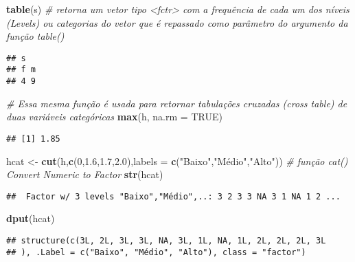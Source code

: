 \documentclass[]{article}
\newenvironment{Shaded}{\begin{snugshade}}{\end{snugshade}}
\newcommand{\KeywordTok}[1]{\textcolor[rgb]{0.13,0.29,0.53}{\textbf{#1}}}
\newcommand{\DataTypeTok}[1]{\textcolor[rgb]{0.13,0.29,0.53}{#1}}
\newcommand{\DecValTok}[1]{\textcolor[rgb]{0.00,0.00,0.81}{#1}}
\newcommand{\FloatTok}[1]{\textcolor[rgb]{0.00,0.00,0.81}{#1}}
\newcommand{\StringTok}[1]{\textcolor[rgb]{0.31,0.60,0.02}{#1}}
\newcommand{\CommentTok}[1]{\textcolor[rgb]{0.56,0.35,0.01}{\textit{#1}}}
\newcommand{\OtherTok}[1]{\textcolor[rgb]{0.56,0.35,0.01}{#1}}
\newcommand{\NormalTok}[1]{#1}
\begin{document}
\begin{Shaded}
\begin{Highlighting}[]
\KeywordTok{table}\NormalTok{(s) }\CommentTok{# retorna um vetor tipo <fctr> com a frequência de cada um dos níveis (Levels) ou categorias do vetor que é repassado como parâmetro do argumento da função table()}
\end{Highlighting}
\end{Shaded}

\begin{verbatim}
## s
## f m 
## 4 9
\end{verbatim}

\begin{Shaded}
\begin{Highlighting}[]
\CommentTok{# Essa mesma função é usada para retornar tabulações cruzadas (cross table) de duas variáveis categóricas}
\KeywordTok{max}\NormalTok{(h, }\DataTypeTok{na.rm =} \OtherTok{TRUE}\NormalTok{)}
\end{Highlighting}
\end{Shaded}

\begin{verbatim}
## [1] 1.85
\end{verbatim}

\begin{Shaded}
\begin{Highlighting}[]
\NormalTok{hcat <-}\StringTok{ }\KeywordTok{cut}\NormalTok{(h,}\KeywordTok{c}\NormalTok{(}\DecValTok{0}\NormalTok{,}\FloatTok{1.6}\NormalTok{,}\FloatTok{1.7}\NormalTok{,}\FloatTok{2.0}\NormalTok{),}\DataTypeTok{labels =} \KeywordTok{c}\NormalTok{(}\StringTok{"Baixo"}\NormalTok{,}\StringTok{"Médio"}\NormalTok{,}\StringTok{"Alto"}\NormalTok{))}
\CommentTok{# função cat() Convert Numeric to Factor}
\KeywordTok{str}\NormalTok{(hcat)}
\end{Highlighting}
\end{Shaded}

\begin{verbatim}
##  Factor w/ 3 levels "Baixo","Médio",..: 3 2 3 3 NA 3 1 NA 1 2 ...
\end{verbatim}

\begin{Shaded}
\begin{Highlighting}[]
\KeywordTok{dput}\NormalTok{(hcat)}
\end{Highlighting}
\end{Shaded}

\begin{verbatim}
## structure(c(3L, 2L, 3L, 3L, NA, 3L, 1L, NA, 1L, 2L, 2L, 2L, 3L
## ), .Label = c("Baixo", "Médio", "Alto"), class = "factor")
\end{verbatim}
\end{document}
